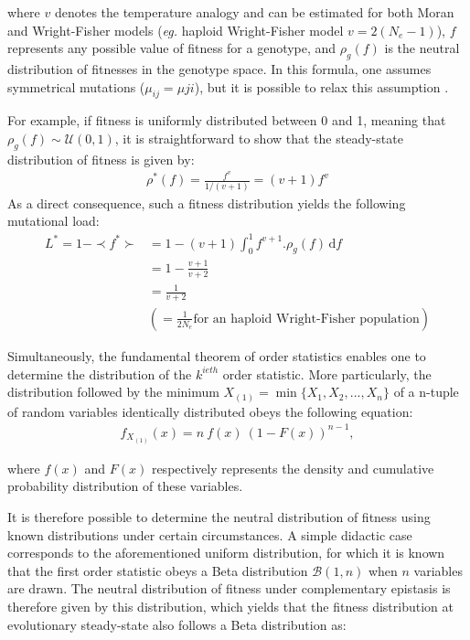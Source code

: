 where $v$ denotes the temperature analogy and can be estimated for both Moran and Wright-Fisher models (\textit{eg.} haploid Wright-Fisher model $v=2(N_e-1)$), $f$ represents any possible value of fitness for a genotype, and $\rho_g(f)$ is the neutral distribution of fitnesses in the genotype space. In this formula, one assumes symmetrical mutations ($\mu_{ij}=\mu{ji}$), but it is possible to relax this assumption \citep{Sella05}.

For example, if fitness is uniformly distributed between 0 and 1, meaning that $\rho_g(f) \sim \mathcal{U}(0,1)$, it is straightforward to show that the steady-state distribution of fitness is given by:
\begin{align}
    \rho^*(f)   =\frac{f^v}{1/(v+1)}=(v+1)f^v
\end{align}
As a direct consequence, such a fitness distribution yields the following mutational load:
\begin{align*}
    L^*=1-\prec f^*\succ &=1- (v+1)\int_{0}^{1} f^{v+1}.\rho_g(f) \, \mathrm{d}f\\
    &=1-\frac{v+1}{v+2}\\
    &=\frac{1}{v+2}\\
    &(=\frac{1}{2N_e}\text{for an haploid Wright-Fisher population})
\end{align*}

Simultaneously, the fundamental theorem of order statistics \citep{Casella02} enables one to determine the distribution of the $k^{ieth}$ order statistic. More particularly, the distribution followed by the minimum $X_{(1)}=\min \{X_1,X_2,...,X_n\}$ of a n-tuple of random variables identically distributed obeys the following equation:
\begin{align}
    f_{X_{(1)}}(x)=n~f(x)~(1-F(x))^{n-1},
    \label{eqFO_formula}
\end{align}

where $f(x)$ and $F(x)$ respectively represents the density and cumulative probability distribution of these variables.

It is therefore possible to determine the neutral distribution of fitness using known distributions under certain circumstances. A simple didactic case corresponds to the aforementioned uniform distribution, for which it is known that the first order statistic obeys a Beta distribution $\mathcal{B}(1,n)$ when $n$ variables are drawn. The neutral distribution of fitness under complementary epistasis is therefore given by this distribution, which yields that the fitness distribution at evolutionary steady-state also follows a Beta distribution as:

